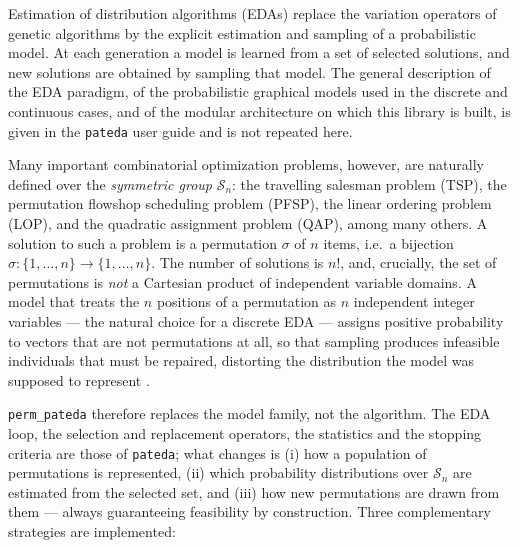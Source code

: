 \documentclass[a4paper,11pt]{article}
\begin{document}
Estimation of distribution algorithms (EDAs)
\citep{Larranhaga_and_Lozano:2002,Lozano_et_al:2005,Muhlenbein_and_Paas:1996,Pelikan_et_al:2006}
replace the variation operators of genetic algorithms by the explicit estimation
and sampling of a probabilistic model.  At each generation a model is learned
from a set of selected solutions, and new solutions are obtained by sampling that
model.  The general description of the EDA paradigm, of the probabilistic
graphical models used in the discrete and continuous cases, and of the modular
architecture on which this library is built, is given in the \texttt{pateda}
user guide and is not repeated here.

Many important combinatorial optimization problems, however, are naturally
defined over the \emph{symmetric group} $\mathcal{S}_n$: the travelling salesman
problem (TSP), the permutation flowshop scheduling problem (PFSP), the linear
ordering problem (LOP), and the quadratic assignment problem (QAP), among many
others.  A solution to such a problem is a permutation $\sigma$ of $n$ items,
i.e.\ a bijection $\sigma: \{1,\ldots,n\} \rightarrow \{1,\ldots,n\}$.  The
number of solutions is $n!$, and, crucially, the set of permutations is
\emph{not} a Cartesian product of independent variable domains.  A model that
treats the $n$ positions of a permutation as $n$ independent integer variables
--- the natural choice for a discrete EDA --- assigns positive probability to
vectors that are not permutations at all, so that sampling produces infeasible
individuals that must be repaired, distorting the distribution the model was
supposed to represent \citep{Ceberio_et_al:2012}.

\texttt{perm\_pateda} therefore replaces the model family, not the algorithm.
The EDA loop, the selection and replacement operators, the statistics and the
stopping criteria are those of \texttt{pateda}; what changes is (i) how a
population of permutations is represented, (ii) which probability distributions
over $\mathcal{S}_n$ are estimated from the selected set, and (iii) how new
permutations are drawn from them --- always guaranteeing feasibility by
construction.  Three complementary strategies are implemented:
\end{document}
